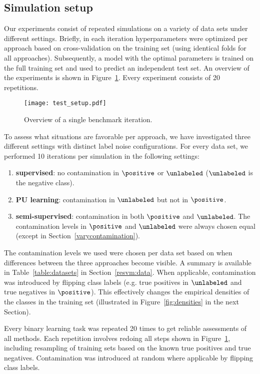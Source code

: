 \subsection{Simulation setup} 
Our experiments consist of repeated simulations on a variety of data sets under different settings. Briefly, in each iteration hyperparameters were optimized per approach based on cross-validation on the training set (using identical folds for all approaches). Subsequently, a model with the optimal parameters is trained on the full training set and used to predict an independent test set. An overview of the experiments is shown in Figure~\ref{fig:benchmark}. Every experiment consists of 20 repetitions. 

\begin{figure}[!h]
  \centering
  \texttt{[image: test\_setup.pdf]}
  \caption{Overview of a single benchmark iteration.} 
  \label{fig:benchmark}
\end{figure}

To assess what situations are favorable per approach, we have investigated three different settings with distinct label noise configurations. For every data set, we performed 10 iterations per simulation in the following settings:
\begin{enumerate}
\item \textbf{supervised}: no contamination in $\positive$ or $\unlabeled$ ($\unlabeled$ is the negative class).
\item \textbf{PU learning}: contamination in $\unlabeled$ but not in $\positive$. %
\item \textbf{semi-supervised}: contamination in both $\positive$ and $\unlabeled$. The contamination levels in $\positive$ and $\unlabeled$ were always chosen equal (except in Section~\ref{varycontamination}).
\end{enumerate}

The contamination levels we used were chosen per data set based on when differences between the three approaches become visible. A summary is available in Table~\ref{table:datasets} in Section~\ref{resvm:data}. When applicable, contamination was introduced by flipping class labels (e.g. true positives in $\unlabeled$ and true negatives in $\positive$). This effectively changes the empirical densities of the classes in the training set (illustrated in Figure~\ref{fig:densities} in the next Section).

Every binary learning task was repeated 20 times to get reliable assessments of all methods. Each repetition involves redoing all steps shown in Figure~\ref{fig:benchmark}, including resampling of training sets based on the known true positives and true negatives. Contamination was introduced at random where applicable by flipping class labels.%

